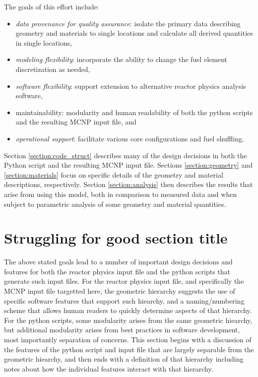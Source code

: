 \documentclass{UWNR_modeling}
\begin{document}
The goals of this effort include:
\begin{itemize}
\item \textit{data provenance for quality assurance}: isolate the primary data describing geometry and materials to single locations and calculate all derived quantities in single locations,
\item \textit{modeling flexibility}: incorporate the ability to change the fuel element discretization as needed,
\item \textit{software flexibility}: support extension to alternative reactor physics analysis software,
\item maintainability: modularity and human readability of both the python scripts and the resulting MCNP input file, and
\item \textit{operational support}: facilitate various core configurations and fuel shuffling.
\end{itemize}

Section \ref{section:code_struct} describes many of the design decisions in both the Python script and the resulting MCNP input file.  Sections \ref{section:geometry} and \ref{section:materials} focus on specific details of the geometry and material descriptions, respectively.  Section \ref{section:analysis} then describes the results that arise from using this model, both in comparison to measured data and when subject to parametric analysis of some geometry and material quantities.

\section{Struggling for good section title}\label{section:structure}

The above stated goals lead to a number of important design decisions and features for both the reactor physics input file and the python scripts that generate such input files.  For the reactor physics input file, and specifically the MCNP input file targetted here, the geometric hierarchy suggests the use of specific software features that support such hiearchy, and a naming/numbering scheme that allows human readers to quickly determine aspects of that hierarchy.  For the python scripts, some modularity arises from the same geometric hiearchy, but additional modularity arises from best practices in software development, most importantly separation of concerns.  This section begins with a discussion of the features of the python script and input file that are largely separable from the geometric hiearchy, and then ends with a definition of that hierarchy including notes about how the individual features interact with that hierarchy.
\end{document}
